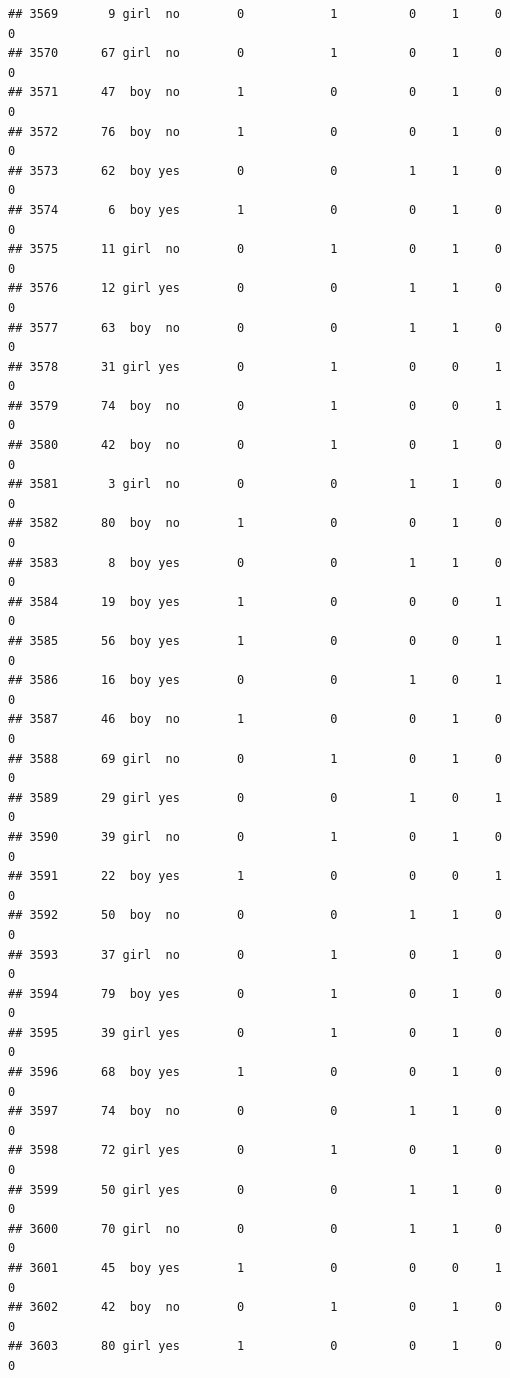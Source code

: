 \documentclass[man]{apa6}
\begin{document}
\begin{verbatim}
## 3569       9 girl  no        0            1          0     1     0     0
## 3570      67 girl  no        0            1          0     1     0     0
## 3571      47  boy  no        1            0          0     1     0     0
## 3572      76  boy  no        1            0          0     1     0     0
## 3573      62  boy yes        0            0          1     1     0     0
## 3574       6  boy yes        1            0          0     1     0     0
## 3575      11 girl  no        0            1          0     1     0     0
## 3576      12 girl yes        0            0          1     1     0     0
## 3577      63  boy  no        0            0          1     1     0     0
## 3578      31 girl yes        0            1          0     0     1     0
## 3579      74  boy  no        0            1          0     0     1     0
## 3580      42  boy  no        0            1          0     1     0     0
## 3581       3 girl  no        0            0          1     1     0     0
## 3582      80  boy  no        1            0          0     1     0     0
## 3583       8  boy yes        0            0          1     1     0     0
## 3584      19  boy yes        1            0          0     0     1     0
## 3585      56  boy yes        1            0          0     0     1     0
## 3586      16  boy yes        0            0          1     0     1     0
## 3587      46  boy  no        1            0          0     1     0     0
## 3588      69 girl  no        0            1          0     1     0     0
## 3589      29 girl yes        0            0          1     0     1     0
## 3590      39 girl  no        0            1          0     1     0     0
## 3591      22  boy yes        1            0          0     0     1     0
## 3592      50  boy  no        0            0          1     1     0     0
## 3593      37 girl  no        0            1          0     1     0     0
## 3594      79  boy yes        0            1          0     1     0     0
## 3595      39 girl yes        0            1          0     1     0     0
## 3596      68  boy yes        1            0          0     1     0     0
## 3597      74  boy  no        0            0          1     1     0     0
## 3598      72 girl yes        0            1          0     1     0     0
## 3599      50 girl yes        0            0          1     1     0     0
## 3600      70 girl  no        0            0          1     1     0     0
## 3601      45  boy yes        1            0          0     0     1     0
## 3602      42  boy  no        0            1          0     1     0     0
## 3603      80 girl yes        1            0          0     1     0     0

\end{verbatim}
\end{document}

